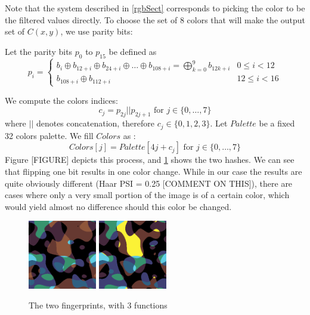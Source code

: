 \documentclass{article}
\begin{document}
Note that the system described in \cref{rgbSect} corresponds to picking the color to be the filtered values directly. To choose the set of 8 colors that will make the output set of $C(x,y)$, we use parity bits:

Let the parity bits $p_0$ to $p_{15}$ be defined as 
\begin{equation*}
	p_i = \begin{cases} 
	    b_{i} \oplus b_{12+i} \oplus b_{24+i} \oplus \dots \oplus b_{108+i} = \bigoplus_{k=0}^9 b_{12k+i} & 0 \leq i < 12\\
	    b_{108 + i} \oplus b_{112 + i} & 12 \leq i < 16
	    \end{cases}
\end{equation*}

We compute the colors indices:
 $$c_j = p_{2j} || p_{2j+1} \text{ for } j \in \{0,\dotsc,7\}$$ where $||$ denotes concatenation, therefore $c_j \in \{0,1,2,3\}$.
 Let $Palette$ be a fixed 32 colors palette. We fill $Colors$ as :
$$Colors[j] = Palette[4j + c_j] \text{ for } j \in \{0, \dotsc, 7\}$$
Figure [FIGURE] depicts this process, and \cref{fig:threeFuncsColor} shows the two hashes. We can see that flipping one bit results in one color change. While in our case the results are quite obviously different (Haar PSI = 0.25 [COMMENT ON THIS]), there are cases where only a very small portion of the image is of a certain color, which would yield almost no difference should this color be changed.

\begin{center}
\begin{figure}
    \centering
    \includegraphics[width=3cm]{figures/Colors.png}
    \includegraphics[width=3cm]{figures/ColorsP67Psi0255.png}
    \caption{The two fingerprints, with 3 functions}
    \label{fig:threeFuncsColor}
\end{figure}
\end{center}
\end{document}

